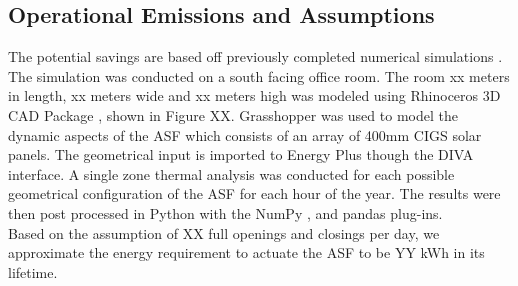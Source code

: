 \subsection{Operational Emissions and Assumptions}

The potential savings are based off previously completed numerical simulations \cite{jayathissa2015abs}. The simulation was conducted on a south facing office room. The room xx meters in length, xx meters wide and xx meters high was modeled using Rhinoceros 3D CAD Package \cite{Rhino}, shown in Figure XX. Grasshopper \cite{grasshopper} was used to model the dynamic aspects of the ASF which consists of an array of 400mm CIGS solar panels. The geometrical input is imported to Energy Plus \cite{energyplus} though the DIVA \cite{DIVA} interface. A single zone thermal analysis was conducted for each possible geometrical configuration of the ASF for each hour of the year. The results were then post processed in Python \cite{python} with the NumPy \cite{numpy}, and pandas \cite{pandas} plug-ins.\\

Based on the assumption of XX full openings and closings per day, we approximate the energy requirement to actuate the ASF to be YY kWh in its lifetime.\\

